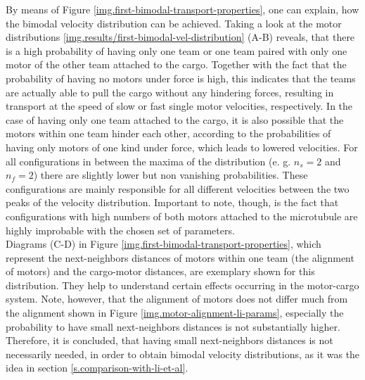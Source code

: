 By means of Figure \ref{img.first-bimodal-transport-properties}, one can explain, how the bimodal velocity distribution can be achieved. Taking a look at the motor distributions
\ref{img.results/first-bimodal-vel-distribution} (A-B) reveals, that there is a high probability of having only one team or one team paired with only one motor of the other team attached to the cargo.
Together with the fact that the probability of having no motors under force is high, this indicates that the teams are actually able to pull the cargo without any hindering forces, resulting in
transport at the speed of slow or fast single motor velocities, respectively. In the case of having only one team attached to the cargo, it is also possible that the motors within one team
hinder each other, according to the probabilities of having only motors of one kind under force, which leads to lowered velocities. For all configurations in between the maxima of the distribution
(e. g. \mbox{$n_s = 2$} and \mbox{$n_f = 2$}) there are slightly lower but non vanishing probabilities. These configurations are mainly responsible for all different velocities between the two
peaks of the velocity distribution. Important to note, though, is the fact that configurations with high numbers of both motors attached to the microtubule are highly improbable with the chosen
set of parameters. \\
Diagrams (C-D) in Figure \ref{img.first-bimodal-transport-properties}, which represent the next-neighbors distances of motors within one team (the alignment of motors) and the cargo-motor
distances, are exemplary shown for this distribution. They help to understand certain effects occurring in the motor-cargo system. Note, however, that the alignment of motors does not differ much
from the alignment shown in Figure \ref{img.motor-alignment-li-params}, especially the probability to have small next-neighbors distances is not substantially higher. Therefore, it is concluded,
that having small next-neighbors distances is not necessarily needed, in order to obtain bimodal velocity distributions, as it was the idea in section \ref{s.comparison-with-li-et-al}.

